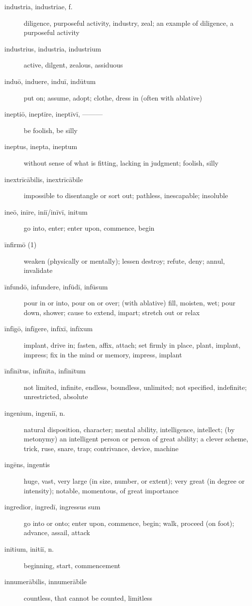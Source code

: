 \begin{description}
    \item[industria, industriae, f.] diligence, purposeful activity, industry, zeal; an example of diligence, a purposeful activity
    \item[industrius, industria, industrium] active, dilgent, zealous, assiduous
    \item[induō, induere, induī, indūtum] put on; assume, adopt; clothe, dress in (often with ablative)
    \item[ineptiō, ineptīre, ineptīvī, ———] be foolish, be silly
    \item[ineptus, inepta, ineptum] without sense of what is fitting, lacking in judgment; foolish, silly
    \item[inextrīcābilis, inextrīcābile] impossible to disentangle or sort out; pathless, inescapable; insoluble
    \item[ineō, inīre, iniī/inīvī, initum] go into, enter; enter upon, commence, begin
    \item[īnfirmō (1)] weaken (physically or mentally); lessen destroy; refute, deny; annul, invalidate
    \item[īnfundō, infundere, infūdī, infūsum] pour in or into, pour on or over; (with ablative) fill, moisten, wet; pour down, shower; cause to extend, impart; stretch out or relax
    \item[īnfīgō, infīgere, infīxī, infīxum] implant, drive in; fasten, affix, attach; set firmly in place, plant, implant, impress; fix in the mind or memory, impress, implant
    \item[īnfīnītus, infīnīta, infīnītum] not limited, infinite, endless, boundless, unlimited; not specified, indefinite; unrestricted, absolute
    \item[ingenium, ingeniī, n.] natural disposition, character; mental ability, intelligence, intellect; (by metonymy) an intelligent person or person of great ability; a clever scheme, trick, ruse, snare, trap; contrivance, device, machine
    \item[ingēns, ingentis] huge, vast, very large (in size, number, or extent); very great (in degree or intensity); notable, momentous, of great importance
    \item[ingredior, ingredī, ingressus sum] \marginnote{*}go into or onto; enter upon, commence, begin; walk, proceed (on foot); advance, assail, attack
    \item[initium, initiī, n.] \marginnote{*}beginning, start, commencement
    \item[innumerābilis, innumerābile] countless, that cannot be counted, limitless

\end{description}
